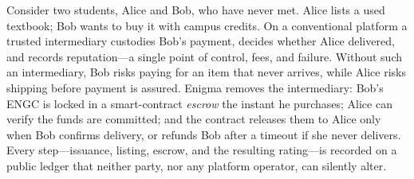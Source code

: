 Consider two students, Alice and Bob, who have never met. Alice lists a used textbook; Bob wants to buy it with campus credits. On a conventional platform a trusted intermediary custodies Bob's payment, decides whether Alice delivered, and records reputation---a single point of control, fees, and failure. Without such an intermediary, Bob risks paying for an item that never arrives, while Alice risks shipping before payment is assured. Enigma removes the intermediary: Bob's ENGC is locked in a smart-contract \emph{escrow} the instant he purchases; Alice can verify the funds are committed; and the contract releases them to Alice only when Bob confirms delivery, or refunds Bob after a timeout if she never delivers. Every step---issuance, listing, escrow, and the resulting rating---is recorded on a public ledger that neither party, nor any platform operator, can silently alter.
